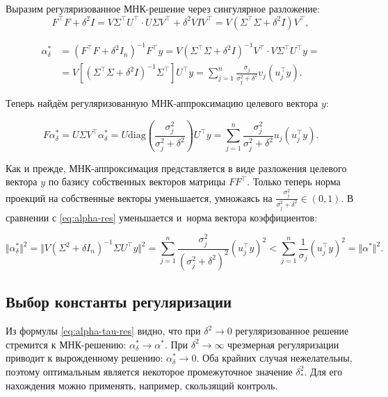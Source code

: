 \documentclass[11pt,a4paper]{article}
\begin{document}
Выразим регуляризованное МНК-решение через сингулярное разложение:
\[ F^\top F + \delta^2 I = V\Sigma^\top U^\top \cdot U \Sigma V^\top + \delta^2 VIV^\top = V (\Sigma^\top \Sigma + \delta^2 I) V^\top, \]

\[
\begin{aligned}
\alpha_\delta^* &= (F^\top F + \delta^2 I_n)^{-1} F^\top y = V (\Sigma^\top \Sigma + \delta^2 I)^{-1} V^\top \cdot V \Sigma^\top U^\top y = \\
&= V \left[ (\Sigma^\top \Sigma + \delta^2 I)^{-1} \Sigma^\top \right] U^\top y = \sum_{j=1}^n \frac{\sigma_j}{\sigma_j^2 + \delta^2} v_j (u_j^\top y).
\end{aligned} \label{eq:alpha-tau-res}\tag{2}
\]

    Теперь найдём регуляризованную МНК-аппроксимацию целевого вектора \(y\):

\[ F\alpha_\delta^\ast = U \Sigma V^\top \alpha_\delta^* = U \mathrm{diag}\left( \frac{\sigma_j^2}{\sigma_j^2 + \delta^2} \right) U^\top y
= \sum_{j=1}^n \frac{\sigma_j^2}{\sigma_j^2 + \delta^2} u_j (u_j^\top y).  \label{eq:F-alpha-tau-res}\tag{3} \]

Как и прежде, МНК-аппроксимация представляется в виде разложения
целевого вектора \(y\) по базису собственных векторов матрицы
\(FF^\top\). Только теперь норма проекций на собственные векторы
уменьшается, умножаясь на
\(\frac{\sigma_j^2}{\sigma_j^2 + \delta^2} \in (0, 1)\). В сравнении с
\eqref{eq:alpha-res} уменьшается и~норма вектора
коэффициентов:

\[ \Vert \alpha_\delta^{\ast} \Vert^2 = \Vert V(\Sigma^2 + \delta I_n)^{-1} \Sigma U^\top y \Vert^2
= \sum_{j=1}^n \frac{\sigma_j^2}{(\sigma_j^2 + \delta^2)^2} (u_j^\top y)^2 < \sum_{j=1}^n \frac{1}{\sigma_j} (u_j^\top y)^2
= \Vert \alpha^{\ast} \Vert^2. \label{eq:alpha-tau-es-norm}\tag{4} \]

    \hypertarget{ux432ux44bux431ux43eux440-ux43aux43eux43dux441ux442ux430ux43dux442ux44b-ux440ux435ux433ux443ux43bux44fux440ux438ux437ux430ux446ux438ux438}{%
\subsection{Выбор константы
регуляризации}\label{ux432ux44bux431ux43eux440-ux43aux43eux43dux441ux442ux430ux43dux442ux44b-ux440ux435ux433ux443ux43bux44fux440ux438ux437ux430ux446ux438ux438}}

Из формулы \eqref{eq:alpha-tau-res} видно, что при
\(\delta^2 \to 0\) регуляризованное решение стремится к МНК-решению:
\(\alpha_\delta^\ast \to \alpha^\ast\). При \(\delta^2 \to \infty\)
чрезмерная регуляризации приводит к вырожденному решению:
\(\alpha^\ast_\delta \to 0\). Оба крайних случая нежелательны, поэтому
оптимальным является некоторое промежуточное значение \(\delta^2_\ast\).
Для его нахождения можно применять, например, скользящий контроль.
\end{document}
